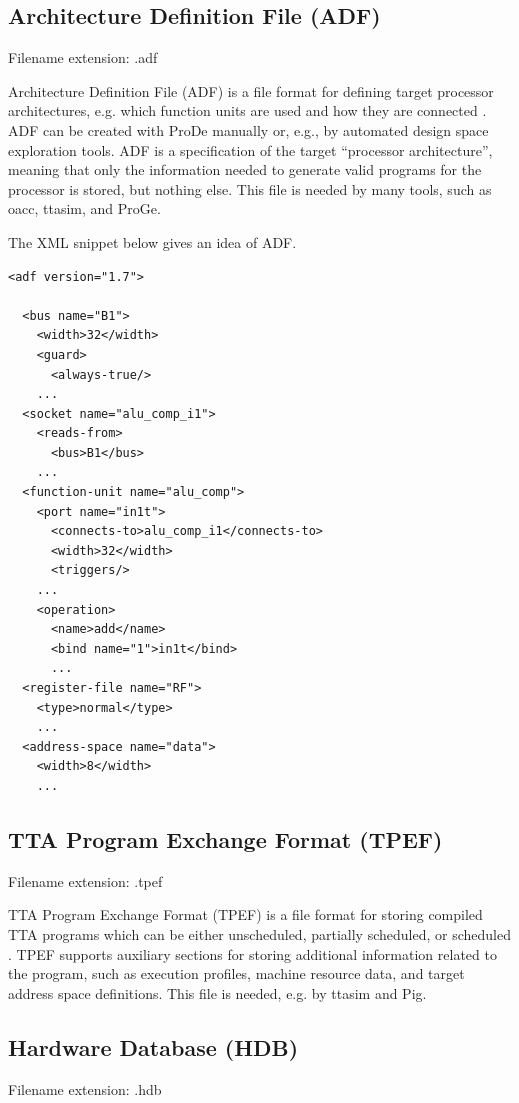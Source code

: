 \documentclass[a4paper,twoside]{tceusermanual}
\begin{document}
\subsection{Architecture Definition File (ADF)}
\label{sec:adf}

Filename extension: .adf

Architecture Definition File (ADF) is a file format for
defining target processor architectures, e.g. which function units are
used and how they are connected \cite{ADF-specs}.  ADF can be created with
ProDe manually or, e.g., by automated design space exploration tools. ADF 
is a specification of the target ``processor architecture'', meaning that only 
the information needed to generate valid programs for the processor is stored, 
but nothing else. This file is needed by many tools, such as oacc, ttasim, and ProGe.

The XML snippet below gives an idea of ADF.
\begin{verbatim}
<adf version="1.7">

  <bus name="B1">
    <width>32</width>
    <guard>
      <always-true/>
    ...
  <socket name="alu_comp_i1">
    <reads-from>
      <bus>B1</bus>
    ...
  <function-unit name="alu_comp">
    <port name="in1t">
      <connects-to>alu_comp_i1</connects-to>
      <width>32</width>
      <triggers/>
    ...
    <operation>
      <name>add</name>
      <bind name="1">in1t</bind>
      ...
  <register-file name="RF">
    <type>normal</type>
    ...
  <address-space name="data">
    <width>8</width>
    ...
\end{verbatim}

\subsection{TTA Program Exchange Format (TPEF)}
\label{section:TPEF}

Filename extension: .tpef

TTA Program Exchange Format (TPEF) is a file format for storing
compiled TTA programs which can be either unscheduled, partially
scheduled, or scheduled
\cite{TPEF-specs}. TPEF supports auxiliary sections for storing
additional information related to the program, such as execution
profiles, machine resource data, and target address space definitions.
This file is needed, e.g.  by ttasim and Pig.

\subsection{Hardware Database (HDB)}
\label{section:hdb}
Filename extension: .hdb
\end{document}
